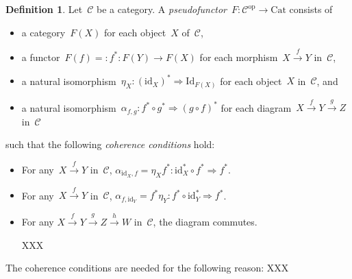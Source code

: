 \documentclass[a4paper,english,12pt]{scrartcl}
\theoremstyle{definition}
\newtheorem{defn}{Definition}[section]
\theoremstyle{plain}
\theoremstyle{remark}
\newcommand{\C}{\mathcal{C}}
\newcommand{\id}{\mathrm{id}}
\newcommand{\op}{\mathrm{op}}
\newcommand{\xra}[1]{\xrightarrow{#1}}
\renewcommand{\_}{\mathpunct{.}\,}
\newcommand{\?}{\,{:}\,}
\newcommand{\Cat}{\mathrm{Cat}}
\newcommand{\Id}{\mathrm{Id}}
\begin{document}
\begin{defn}Let~$\C$ be a category. A \emph{pseudofunctor}~$F : \C^\op \to
\Cat$ consists of
\begin{itemize}
\item a category~$F(X)$ for each object~$X$ of~$\C$,
\item a functor~$F(f) =: f^* : F(Y) \to F(X)$ for each morphism~$X \xra{f} Y$ in~$\C$,
\item a natural isomorphism~$\eta_X : (\id_X)^* \Rightarrow \Id_{F(X)}$ for each
object~$X$ in~$\C$, and
\item a natural isomorphism~$\alpha_{f,g} : f^* \circ g^* \Rightarrow (g \circ
f)^*$ for each diagram~$X \xra{f} Y \xra{g} Z$ in~$\C$
\end{itemize}
such that the following \emph{coherence conditions} hold:
\begin{itemize}
\item For any~$X \xra{f} Y$ in~$\C$, $\alpha_{\id_X,f} = \eta_X f^* : \id_X^* \circ f^*
\Rightarrow f^*$.
\item For any~$X \xra{f} Y$ in~$\C$, $\alpha_{f,\id_Y} = f^* \eta_Y : f^* \circ
\id_Y^* \Rightarrow f^*$.
\item For any $X \xra{f} Y \xra{g} Z \xra{h} W$ in~$\C$, the diagram commutes.

XXX
\end{itemize}
\end{defn}

The coherence conditions are needed for the following reason: XXX
\end{document}
